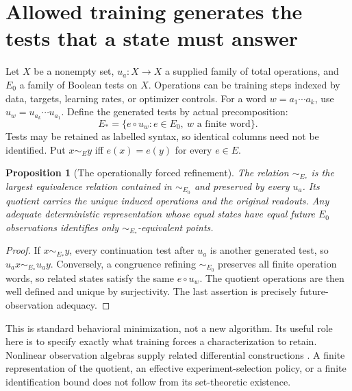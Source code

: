 \documentclass[11pt]{article}
\newtheorem{proposition}[theorem]{Proposition}
\theoremstyle{definition}\newtheorem{definition}[theorem]{Definition}
\theoremstyle{remark}\newtheorem{remark}[theorem]{Remark}
\begin{document}
\section{Allowed training generates the tests that a state must answer}
Let $X$ be a nonempty set, $u_a:X\to X$ a supplied family of total operations,
and $E_0$ a family of Boolean tests on $X$. Operations can be training steps
indexed by data, targets, learning rates, or optimizer controls. For a word
$w=a_1\cdots a_k$, use $u_w=u_{a_k}\cdots u_{a_1}$. Define the generated tests
by actual precomposition:
\[
 E_*=\{e\circ u_w:e\in E_0,\ w\text{ a finite word}\}.
\]
Tests may be retained as labelled syntax, so identical columns need not be
identified. Put $x\sim_E y$ iff $e(x)=e(y)$ for every $e\in E$.

\begin{proposition}[The operationally forced refinement]
The relation $\sim_{E_*}$ is the largest equivalence relation contained in
$\sim_{E_0}$ and preserved by every $u_a$. Its quotient carries the unique
induced operations and the original readouts. Any adequate deterministic
representation whose equal states have equal future $E_0$ observations
identifies only $\sim_{E_*}$-equivalent points.
\end{proposition}
\begin{proof}
If $x\sim_{E_*}y$, every continuation test after $u_a$ is another generated
test, so $u_a x\sim_{E_*}u_a y$. Conversely, a congruence refining
$\sim_{E_0}$ preserves all finite operation words, so related states satisfy
the same $e\circ u_w$. The quotient operations are then well defined and
unique by surjectivity. The last assertion is precisely future-observation
adequacy.
\end{proof}
This is standard behavioral minimization, not a new algorithm. Its useful
role here is to specify exactly what training forces a characterization to
retain. Nonlinear observation algebras supply related differential
constructions \cite{hermann}. A finite representation of the quotient,
an effective experiment-selection policy, or a finite identification bound
does not follow from its set-theoretic existence.
\end{document}
